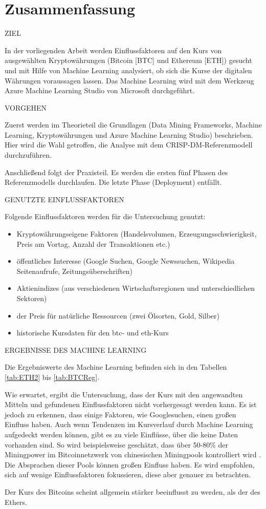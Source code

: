 \chapter*{Zusammenfassung}

{\normalsize ZIEL} \par
In der vorliegenden Arbeit werden Einflussfaktoren auf den Kurs von ausgewählten Kryptowährungen (Bitcoin [BTC] und Ethereum [ETH]) gesucht und mit Hilfe von Machine Learning analysiert, ob sich die Kurse der digitalen Währungen voraussagen lassen. Das Machine Learning wird mit dem Werkzeug Azure Machine Learning Studio von Microsoft durchgeführt.

{\normalsize VORGEHEN} \par
Zuerst werden im Theorieteil die Grundlagen (Data Mining Frameworks, Machine Learning, Kryptowährungen und Azure Machine Learning Studio) beschrieben. Hier wird die Wahl getroffen, die Analyse mit dem CRISP-DM-Referenzmodell durchzuführen.\par
Anschließend folgt der Praxisteil. Es werden die ersten fünf Phasen des Referenzmodells durchlaufen. Die letzte Phase (Deployment) entfällt.

{\normalsize GENUTZTE EINFLUSSFAKTOREN} \par
Folgende Einflussfaktoren werden für die Untersuchung genutzt:
\begin{itemize}
\item Kryptowährungseigene Faktoren (Handelsvolumen, Erzeugungsschwierigkeit, Preis am Vortag, Anzahl der Transaktionen etc.)
\item öffentliches Interesse (Google Suchen, Google Newssuchen, Wikipedia Seitenaufrufe, Zeitungsüberschriften)
\item Aktienindizes (aus verschiedenen Wirtschaftsregionen und unterschiedlichen Sektoren)
\item der Preis für natürliche Ressourcen (zwei Ölsorten, Gold, Silber)
\item historische Kursdaten für den \gls{btc}- und \gls{eth}-Kurs
\end{itemize}

{\normalsize ERGEBNISSE DES MACHINE LEARNING} \par
Die Ergebniswerte des Machine Learning befinden sich in den Tabellen \ref{tab:ETH2} bis \ref{tab:BTCReg}.\par
Wie erwartet, ergibt die Untersuchung, dass der Kurs mit den angewandten Mitteln und gefundenen Einflussfaktoren nicht vorhergesagt werden kann. Es ist jedoch zu erkennen, dass einige Faktoren, wie Googlesuchen, einen großen Einfluss haben. Auch wenn Tendenzen im Kursverlauf durch Machine Learning aufgedeckt werden können, gibt es zu viele Einflüsse, über die keine Daten vorhanden sind. So wird beispielsweise geschätzt, dass über 50-80\% der Miningpower im Bitcoinnetzwerk von chinesischen Miningpools kontrolliert wird . Die Absprachen dieser Pools können großen Einfluss haben. Es wird empfohlen, sich auf wenige Einflussfaktoren fokussieren, diese aber genauer zu betrachten. \par
Der Kurs des Bitcoins scheint allgemein stärker beeinflusst zu werden, als der des Ethers.

